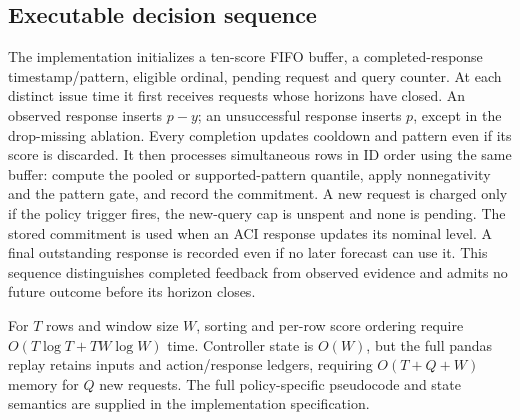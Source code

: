 \documentclass[journal,onecolumn,10pt]{IEEEtran}
\begin{document}
\subsection{Executable decision sequence}
The implementation initializes a ten-score FIFO buffer, a completed-response timestamp/pattern, eligible ordinal, pending request and query counter. At each distinct issue time it first receives requests whose horizons have closed. An observed response inserts $p-y$; an unsuccessful response inserts $p$, except in the drop-missing ablation. Every completion updates cooldown and pattern even if its score is discarded. It then processes simultaneous rows in ID order using the same buffer: compute the pooled or supported-pattern quantile, apply nonnegativity and the pattern gate, and record the commitment. A new request is charged only if the policy trigger fires, the new-query cap is unspent and none is pending. The stored commitment is used when an ACI response updates its nominal level. A final outstanding response is recorded even if no later forecast can use it. This sequence distinguishes completed feedback from observed evidence and admits no future outcome before its horizon closes.

For $T$ rows and window size $W$, sorting and per-row score ordering require $O(T\log T+TW\log W)$ time. Controller state is $O(W)$, but the full pandas replay retains inputs and action/response ledgers, requiring $O(T+Q+W)$ memory for $Q$ new requests. The full policy-specific pseudocode and state semantics are supplied in the implementation specification.
\end{document}
